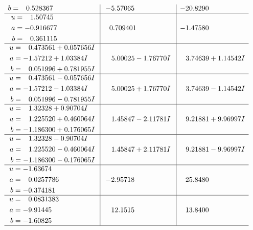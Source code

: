 \documentclass[1p]{elsarticle_modified}
\theoremstyle{definition}
\begin{document}
$$\begin{array}{c|c|c}
\begin{aligned}
b &= \phantom{-}0.528367\phantom{ +0.000000I}\end{aligned}
 & -5.57065\phantom{ +0.000000I} & -20.8290\phantom{ +0.000000I} \\ \hline\begin{aligned}
u &= \phantom{-}1.50745\phantom{ +0.000000I} \\
a &= -0.916677\phantom{ +0.000000I} \\
b &= \phantom{-}0.361115\phantom{ +0.000000I}\end{aligned}
 & \phantom{-}0.709401\phantom{ +0.000000I} & -1.47580\phantom{ +0.000000I} \\ \hline\begin{aligned}
u &= \phantom{-}0.473561 + 0.057656 I \\
a &= -1.57212 + 1.03384 I \\
b &= \phantom{-}0.051996 + 0.781955 I\end{aligned}
 & \phantom{-}5.00025 - 1.76770 I & \phantom{-}3.74639 + 1.14542 I \\ \hline\begin{aligned}
u &= \phantom{-}0.473561 - 0.057656 I \\
a &= -1.57212 - 1.03384 I \\
b &= \phantom{-}0.051996 - 0.781955 I\end{aligned}
 & \phantom{-}5.00025 + 1.76770 I & \phantom{-}3.74639 - 1.14542 I \\ \hline\begin{aligned}
u &= \phantom{-}1.32328 + 0.90704 I \\
a &= \phantom{-}1.225520 + 0.460064 I \\
b &= -1.186300 + 0.176065 I\end{aligned}
 & \phantom{-}1.45847 - 2.11781 I & \phantom{-}9.21881 + 9.96997 I \\ \hline\begin{aligned}
u &= \phantom{-}1.32328 - 0.90704 I \\
a &= \phantom{-}1.225520 - 0.460064 I \\
b &= -1.186300 - 0.176065 I\end{aligned}
 & \phantom{-}1.45847 + 2.11781 I & \phantom{-}9.21881 - 9.96997 I \\ \hline\begin{aligned}
u &= -1.63674\phantom{ +0.000000I} \\
a &= \phantom{-}0.0257786\phantom{ +0.000000I} \\
b &= -0.374181\phantom{ +0.000000I}\end{aligned}
 & -2.95718\phantom{ +0.000000I} & \phantom{-}25.8480\phantom{ +0.000000I} \\ \hline\begin{aligned}
u &= \phantom{-}0.0831383\phantom{ +0.000000I} \\
a &= -9.91445\phantom{ +0.000000I} \\
b &= -1.60825\phantom{ +0.000000I}\end{aligned}
 & \phantom{-}12.1515\phantom{ +0.000000I} & \phantom{-}13.8400\phantom{ +0.000000I}\\
 \hline 
 \end{array}$$\newpage\newpage\renewcommand{\arraystretch}{1}
\end{document}
